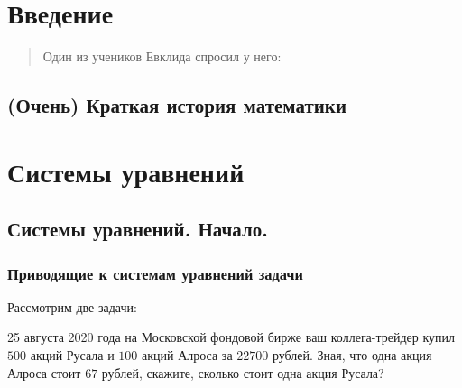 \documentclass[11pt,fleqn]{book} %
\begin{document}



\pagestyle{empty} %

\tableofcontents %


\pagestyle{fancy} %

\part{Введение}

\begin{quote}
Один из учеников Евклида спросил у него: 
\end{quote}

\chapter{(Очень) Краткая история математики}




\part{Системы уравнений}

\chapter{Системы уравнений. Начало.}

\section{Приводящие к системам уравнений задачи}

Рассмотрим две задачи:

\begin{problem}
25 августа 2020 года на Московской фондовой бирже ваш коллега-трейдер купил $500$ акций Русала и $100$ акций Алроса за $22700$ рублей. Зная, что одна акция Алроса стоит $67$ рублей, скажите, сколько стоит одна акция Русала?
\end{problem}
\end{document}
